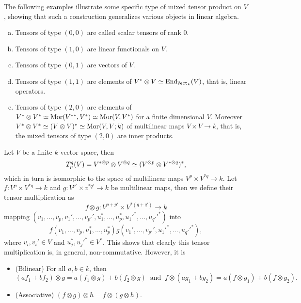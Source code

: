 \begin{example}
    The following examples illustrate some specific type of mixed tensor product
    on \(V\), showing that such a construction generalizes various objects in
    linear algebra.
    \begin{enumerate}[(a)]
        \item Tensors of type \((0,0)\) are called scalar tensors of rank \(0\).
        \item Tensors of type \((1, 0)\) are linear functionals on \(V\).
        \item Tensors of type \((0, 1)\) are vectors of \(V\).
        \item Tensors of type \((1, 1)\) are elements of \(V^* \otimes V \simeq
              \operatorname{End}_{{\texttt{Vect}}_k}(V)\), that is, linear operators.
        \item Tensors of type \((2, 0)\) are elements of \(V^* \otimes V^* \simeq
              \operatorname{Mor}(V^{**}, V^*) \simeq \operatorname{Mor}(V, V^*)\) for a finite dimensional \(V\).
              Moreover \(V^* \otimes V^* \simeq (V \otimes V)^* \simeq \operatorname{Mor}(V, V; k)\) of
              multilinear maps \(V \times V \to k\), that is, the mixed tensors of type
              \((2, 0)\) are inner products.
    \end{enumerate}
\end{example}

\begin{definition}
    Let \(V\) be a finite \(k\)-vector space, then
    \[
        T_p^q(V) = V^{*\otimes p} \otimes V^{\otimes q} \simeq (V^{\otimes p} \otimes V^{* \otimes q})^*,
    \]
    which in turn is isomorphic to the space of multilinear maps \(V^p \times V^{*q} \to
    k\). Let \(f: V^p \times V^{*q} \to k\) and \(g: V^{p'} \times v^{*q'} \to k\) be multilinear
    maps, then we define their tensor multiplication as
    \[
        f \otimes g: V^{p + p'} \times V^{*(q + q')} \to k
    \]
    mapping \((v_1, \dots, v_p, v_1', \dots, v_{p'}', u_1^*, \dots, u_p^*,
    u_1'^{*}, \dots, u_{q'}'^{*})\) into
    \[
        f(v_1, \dots, v_p, u_1^*, \dots, u_p^*)
        g(v_1', \dots, v_{p'}', u_1'^{*}, \dots, u_{q'}'^{*}),
    \]
    where \(v_i, v_i' \in V\) and \(u_j^*, u_j'^{*} \in V^*\). This shows that clearly
    this tensor multiplication is, in general, non-commutative. However, it is
    \begin{itemize}
        \item (Bilinear) For all \(a, b \in k\), then
              \[
                  (a f_1 + b f_2) \otimes g = a (f_1 \otimes g) + b (f_2 \otimes g)
                  \ \text{ and }\
                  f \otimes (a g_1 + b g_2) = a (f \otimes g_1) + b (f \otimes g_2).
              \]
        \item (Associative) \((f \otimes g) \otimes h = f \otimes (g \otimes h)\).
    \end{itemize}
\end{definition}

